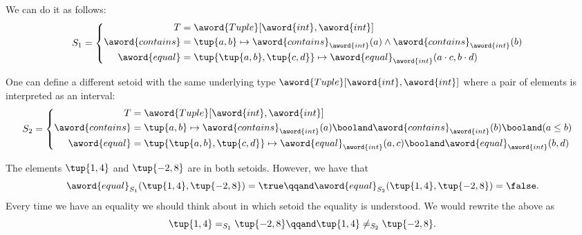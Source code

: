 We can do it as follows:
\begin{equation}
    S_1 =
    \begin{cases}
        \begin{aligned}
            T                & =
            \aword{Tuple}[\aword{int}, \aword{int}]
            \\
            \aword{contains} & = \tup{a,b} \mapsto \aword{contains}_{\aword{int}}(a)  \wedge \aword{contains}_{\aword{int}}(b)
            \\
            \aword{equal}    & = \tup{\tup{a,b}, \tup{c,d}}
            \mapsto \aword{equal}_{\aword{int}} (a\cdot c, b\cdot d)
        \end{aligned}
    \end{cases}
\end{equation}

One can define a different setoid with the same underlying type $\aword{Tuple}[\aword{int}, \aword{int}]$ where a pair of elements is interpreted as an interval:
\begin{equation}
    S_2 =
    \begin{cases}
        \begin{aligned}
            T                & = \aword{Tuple}[\aword{int}, \aword{int}] \\
            \aword{contains} & = \tup{a,b} \mapsto
            \aword{contains}_{\aword{int}}(a)
            \booland
            \aword{contains}_{\aword{int}}(b)
            \booland
            (a\leq b) \\
            \aword{equal}    & = \tup{\tup{a,b}, \tup{c,d}}
            \mapsto
            \aword{equal}_{\aword{int}}(a,c)
            \booland
            \aword{equal}_{\aword{int}}(b,d)
        \end{aligned}
    \end{cases}
\end{equation}

The elements $\tup{1,4}$ and $\tup{-2, 8}$ are in both setoids.
However, we have that
\begin{equation}
    \aword{equal}_{S_1} (\tup{1,4}, \tup{-2, 8}) = \true
    \qqand
    \aword{equal}_{S_2} (\tup{1,4}, \tup{-2, 8}) = \false .
\end{equation}
Every time we have an equality we should think about in which setoid the equality is understood.
We would rewrite the above as
\begin{equation}
    \tup{1,4} =_{S_1} \tup{-2, 8}
    \qqand
    \tup{1,4} \neq_{S_2} \tup{-2, 8}.
\end{equation}

